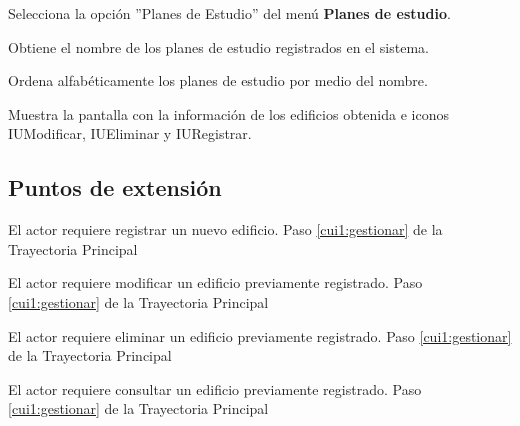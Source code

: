 \begin{UCtrayectoria}
	
	\UCpaso [\UCactor] Selecciona la opción ''Planes de Estudio'' del menú \textbf{Planes de estudio}. %
	
	\UCpaso [\UCsist] Obtiene el nombre de los planes de estudio registrados en el sistema.
	
	\UCpaso [\UCsist] Ordena alfabéticamente los planes de estudio por medio del nombre.
	
	\UCpaso[\UCsist] Muestra la pantalla  con la información de los edificios obtenida e iconos IUModificar, IUEliminar y IURegistrar. 
	\label{cui1:gestionar}
\end{UCtrayectoria}

\subsection{Puntos de extensión}

\UCExtensionPoint 
{El actor requiere registrar un nuevo edificio.}
{Paso \ref{cui1:gestionar} de la Trayectoria Principal}
{}

\UCExtensionPoint 
{El actor requiere modificar un edificio previamente registrado.}
{Paso \ref{cui1:gestionar} de la Trayectoria Principal}
{}

\UCExtensionPoint 
{El actor requiere eliminar un edificio previamente registrado.}
{Paso \ref{cui1:gestionar} de la Trayectoria Principal}
{}

\UCExtensionPoint 
{El actor requiere consultar un edificio previamente registrado.}
{Paso \ref{cui1:gestionar} de la Trayectoria Principal}
{}

